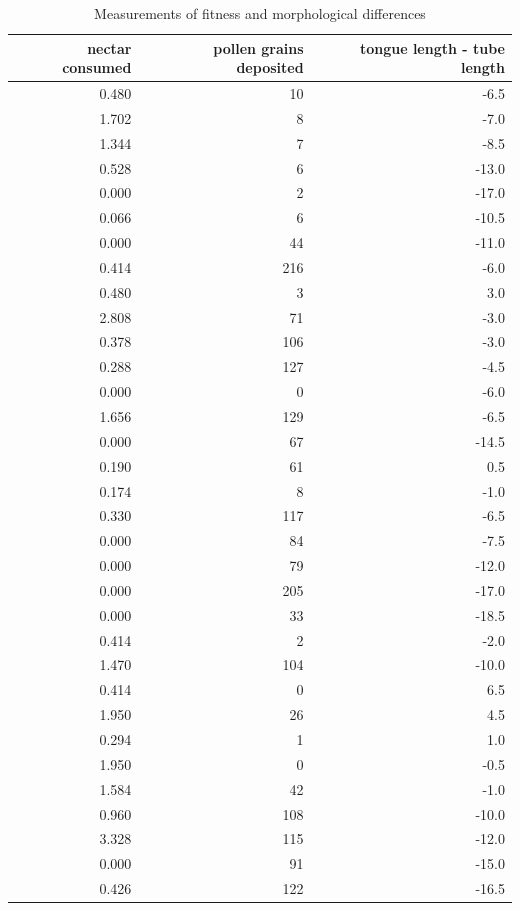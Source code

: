 \documentclass[]{article}
\begin{document}
\begin{table}[t]

\caption{\label{tab:unnamed-chunk-1}Measurements of fitness and morphological differences}
\centering
\begin{tabular}{r|r|r}
\hline
nectar consumed & pollen grains deposited & tongue length - tube length\\
\hline
0.480 & 10 & -6.5\\
\hline
1.702 & 8 & -7.0\\
\hline
1.344 & 7 & -8.5\\
\hline
0.528 & 6 & -13.0\\
\hline
0.000 & 2 & -17.0\\
\hline
0.066 & 6 & -10.5\\
\hline
0.000 & 44 & -11.0\\
\hline
0.414 & 216 & -6.0\\
\hline
0.480 & 3 & 3.0\\
\hline
2.808 & 71 & -3.0\\
\hline
0.378 & 106 & -3.0\\
\hline
0.288 & 127 & -4.5\\
\hline
0.000 & 0 & -6.0\\
\hline
1.656 & 129 & -6.5\\
\hline
0.000 & 67 & -14.5\\
\hline
0.190 & 61 & 0.5\\
\hline
0.174 & 8 & -1.0\\
\hline
0.330 & 117 & -6.5\\
\hline
0.000 & 84 & -7.5\\
\hline
0.000 & 79 & -12.0\\
\hline
0.000 & 205 & -17.0\\
\hline
0.000 & 33 & -18.5\\
\hline
0.414 & 2 & -2.0\\
\hline
1.470 & 104 & -10.0\\
\hline
0.414 & 0 & 6.5\\
\hline
1.950 & 26 & 4.5\\
\hline
0.294 & 1 & 1.0\\
\hline
1.950 & 0 & -0.5\\
\hline
1.584 & 42 & -1.0\\
\hline
0.960 & 108 & -10.0\\
\hline
3.328 & 115 & -12.0\\
\hline
0.000 & 91 & -15.0\\
\hline
0.426 & 122 & -16.5\\

\end{tabular}
\end{table}
\end{document}
